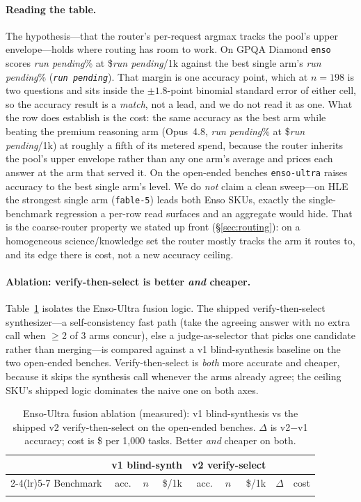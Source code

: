 \documentclass[11pt]{article}
\newcommand{\runpending}{\textit{\small run pending}}
\providecommand{\hEnsoGPQAacc}{\runpending}
\providecommand{\hEnsoGPQAcost}{\runpending}
\providecommand{\hBestGPQAname}{\runpending}
\providecommand{\hBestGPQAacc}{\runpending}
\providecommand{\hOpusGPQAacc}{\runpending}
\providecommand{\hOpusGPQAcost}{\runpending}
\begin{document}
\paragraph{Reading the table.} The hypothesis---that the router's per-request
argmax tracks the pool's upper envelope---holds where routing has room to work. On
GPQA Diamond \texttt{enso} scores \hEnsoGPQAacc\% at \$\hEnsoGPQAcost/1k against the
best single arm's \hBestGPQAacc\% (\texttt{\hBestGPQAname}). That margin is one
accuracy point, which at $n{=}198$ is two questions and sits inside the $\pm1.8$-point
binomial standard error of either cell, so the accuracy result is a \emph{match},
not a lead, and we do not read it as one. What the row does establish is the cost:
the same accuracy as the best arm while beating the premium reasoning arm
(Opus~4.8, \hOpusGPQAacc\% at \$\hOpusGPQAcost/1k) at roughly a fifth of its metered
spend, because the router inherits the pool's upper envelope rather than any one
arm's average and prices each answer at the arm that served it. On the open-ended
benches \texttt{enso-ultra} raises accuracy to the best single arm's level. We do
\emph{not} claim a clean sweep---on HLE the strongest single arm (\texttt{fable-5})
leads both Enso SKUs, exactly the single-benchmark regression a per-row read
surfaces and an aggregate would hide. That is the coarse-router property we stated
up front (\S\ref{sec:routing}): on a homogeneous science/knowledge set the router
mostly tracks the arm it routes to, and its edge there is cost, not a new accuracy
ceiling.

\paragraph{Ablation: verify-then-select is better \emph{and} cheaper.}
Table~\ref{tab:ablation} isolates the Enso-Ultra fusion logic. The shipped
verify-then-select synthesizer---a self-consistency fast path (take the agreeing
answer with no extra call when $\ge$2 of 3 arms concur), else a judge-as-selector
that picks one candidate rather than merging---is compared against a v1
blind-synthesis baseline on the two open-ended benches. Verify-then-select is
\emph{both} more accurate and cheaper, because it skips the synthesis call whenever
the arms already agree; the ceiling SKU's shipped logic dominates the naive one on
both axes.

\begin{table}[t]
\centering\small\setlength{\tabcolsep}{4pt}
\caption{Enso-Ultra fusion ablation (measured): v1 blind-synthesis vs the shipped
v2 verify-then-select on the open-ended benches. $\Delta$ is v2$-$v1 accuracy;
cost is \$ per 1{,}000 tasks. Better \emph{and} cheaper on both.}
\label{tab:ablation}
\begin{tabular}{@{}lrrrrrrrr@{}}
\toprule
& \multicolumn{3}{c}{v1 blind-synth} & \multicolumn{3}{c}{v2 verify-select} & & \\
\cmidrule(lr){2-4}\cmidrule(lr){5-7}
Benchmark & acc. & $n$ & \$/1k & acc. & $n$ & \$/1k & $\Delta$ & cost \\
\midrule
 \\
\bottomrule
\end{tabular}
\end{table}
\end{document}
